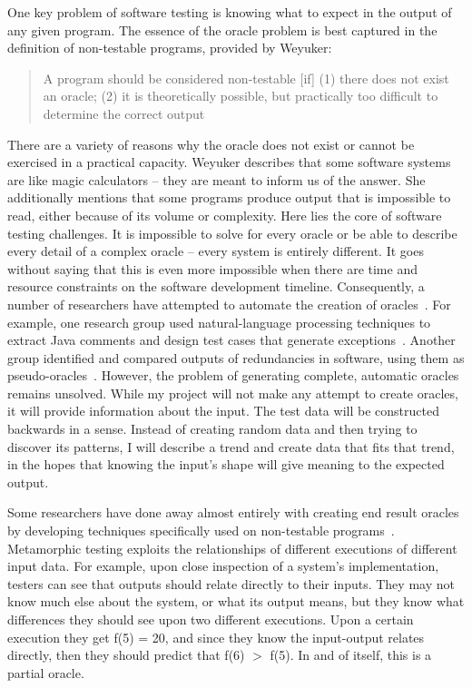 One key problem of software testing is knowing what to expect in the output of any given program. The essence of the oracle problem is best captured in the definition of non-testable programs, provided by Weyuker:
\begin{quote}
A program should be considered non-testable [if] (1) there does not exist an oracle; (2) it is theoretically possible, but practically too difficult to determine the correct output~\cite{Chays:2000:FTD:347636.348954}
\end{quote}
There are a variety of reasons why the oracle does not exist or cannot be exercised in a practical capacity. Weyuker describes that some software systems are like magic calculators – they are meant to inform us of the answer. She additionally mentions that some programs produce output that is impossible to read, either because of its volume or complexity. Here lies the core of software testing challenges. It is impossible to solve for every oracle or be able to describe every detail of a complex oracle – every system is entirely different. It goes without saying that this is even more impossible when there are time and resource constraints on the software development timeline. Consequently, a number of researchers have attempted to automate the creation of oracles~\cite{6963470}. For example, one research group used natural-language processing techniques to extract Java comments and design test cases that generate exceptions~\cite{Goffi:2016:AGO:2931037.2931061}. Another group identified and compared outputs of redundancies in software, using them as pseudo-oracles~\cite{Carzaniga:2014:COI:2568225.2568287}. However, the problem of generating complete, automatic oracles remains unsolved. While my project will not make any attempt to create oracles, it will provide information about the input. The test data will be constructed backwards in a sense. Instead of creating random data and then trying to discover its patterns, I will describe a trend and create data that fits that trend, in the hopes that knowing the input's shape will give meaning to the expected output.

Some researchers have done away almost entirely with creating end result oracles by developing techniques specifically used on non-testable programs~\cite{Lindvall:2017:MMT:3103620.3103632,Segura:2017:TAD:3103620.3103626,Chen:2015:MTS:2819261.2819278,Chen:2016:SOC:2970276.2970366,Lindvall:2015:MMT:2819009.2819030}. Metamorphic testing exploits the relationships of different executions of different input data. For example, upon close inspection of a system's implementation, testers can see that outputs should relate directly to their inputs. They may not know much else about the system, or what its output means, but they know what differences they should see upon two different executions. Upon a certain execution they get f(5) = 20, and since they know the input-output relates directly, then they should predict that f(6) $>$ f(5). In and of itself, this is a partial oracle.

